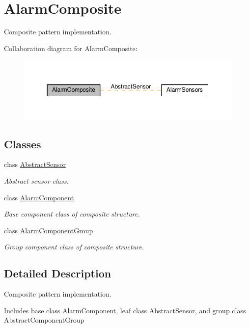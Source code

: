 \hypertarget{group__AlarmComposite}{}\section{Alarm\+Composite}
\label{group__AlarmComposite}


Composite pattern implementation.  


Collaboration diagram for Alarm\+Composite\+:
\nopagebreak
\begin{figure}[H]
\begin{center}
\leavevmode
\includegraphics[width=350pt]{group__AlarmComposite}
\end{center}
\end{figure}
\subsection*{Classes}
\begin{DoxyCompactItemize}
\item 
class \hyperlink{classAbstractSensor}{Abstract\+Sensor}
\begin{DoxyCompactList}\small\item\em Abstract sensor class. \end{DoxyCompactList}\item 
class \hyperlink{classAlarmComponent}{Alarm\+Component}
\begin{DoxyCompactList}\small\item\em Base component class of composite structure. \end{DoxyCompactList}\item 
class \hyperlink{classAlarmComponentGroup}{Alarm\+Component\+Group}
\begin{DoxyCompactList}\small\item\em Group component class of composite structure. \end{DoxyCompactList}\end{DoxyCompactItemize}


\subsection{Detailed Description}
Composite pattern implementation. 

Includes base class \hyperlink{classAlarmComponent}{Alarm\+Component}, leaf class \hyperlink{classAbstractSensor}{Abstract\+Sensor}, and group class Abstract\+Component\+Group 